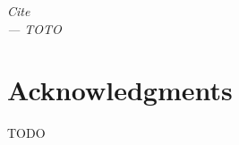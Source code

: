 
\begin{flushright}{\slshape    
  	 Cite \\ \medskip
  	 --- TOTO} 
\end{flushright}



\bigskip

\begingroup
\let\clearpage\relax
\let\cleardoublepage\relax
\let\cleardoublepage\relax
\chapter*{Acknowledgments}

TODO


\endgroup



